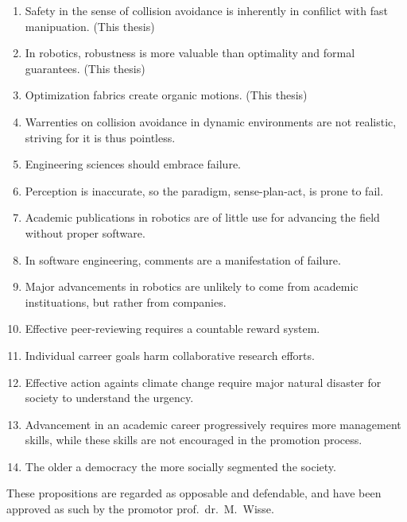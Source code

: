 \documentclass[nativefonts]{TUD-dissertation2020}
\begin{document}
\begin{enumerate}

  \item Safety in the sense of collision avoidance is inherently in confilict
    with fast manipuation. (This thesis)
  \item In robotics, robustness is more valuable than optimality and formal
    guarantees. (This thesis)
  \item Optimization fabrics create organic motions. (This thesis)
  \item Warrenties on collision avoidance in dynamic environments are not
    realistic, striving for it is thus pointless.
  \item Engineering sciences should embrace failure.
  \item Perception is inaccurate, so the paradigm, sense-plan-act, is prone to
    fail.
  \item Academic publications in robotics are of little use for advancing the
    field without proper software.
  \item In software engineering, comments are a manifestation of failure.
  \item Major advancements in robotics are unlikely to come from academic
    instituations, but rather from companies.
  \item Effective peer-reviewing requires a countable reward system.
  \item Individual carreer goals harm collaborative research efforts.
  \item Effective action againts climate change require major natural disaster
    for society to understand the urgency.
  \item Advancement in an academic career progressively requires more management
    skills, while these skills are not encouraged in the promotion process.
  \item The older a democracy the more socially segmented the society.
\end{enumerate}

\bigskip
\bigskip

\begin{center}
These propositions are regarded as opposable and defendable, and have been approved as such by the promotor prof.\ dr.\ M.\ Wisse.
\end{center}
\end{document}
